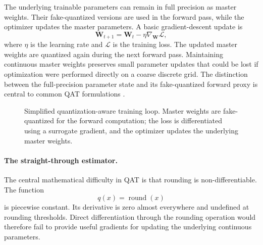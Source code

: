 The underlying trainable parameters can remain in full precision as
master weights. Their fake-quantized versions are used in the forward
pass, while the optimizer updates the master parameters. A basic
gradient-descent update is
\begin{equation}
    \mathbf{W}_{t+1}
    =
    \mathbf{W}_t
    -
    \eta
    \nabla_{\mathbf{W}}\mathcal{L},
    \label{eq:quant-master-weight-update}
\end{equation}
where \(\eta\) is the learning rate and \(\mathcal{L}\) is the training
loss. The updated master weights are quantized again during the next
forward pass. Maintaining continuous master weights preserves small
parameter updates that could be lost if optimization were performed
directly on a coarse discrete grid. The distinction between the
full-precision parameter state and its fake-quantized forward proxy is
central to common QAT formulations
\parencite{song2026targetcentricqat}.

\begin{figure}[htbp]
    \centering
    
    \caption{Simplified quantization-aware training loop. Master weights
    are fake-quantized for the forward computation; the loss is
    differentiated using a surrogate gradient, and the optimizer updates
    the underlying master weights.}
    \label{fig:quant-qat-flow}
\end{figure}

\paragraph{The straight-through estimator.}
The central mathematical difficulty in QAT is that rounding is
non-differentiable. The function
\begin{equation}
    q(x)=\operatorname{round}(x)
    \label{eq:quant-round-function}
\end{equation}
is piecewise constant. Its derivative is zero almost everywhere and
undefined at rounding thresholds. Direct differentiation through the
rounding operation would therefore fail to provide useful gradients
for updating the underlying continuous parameters.

